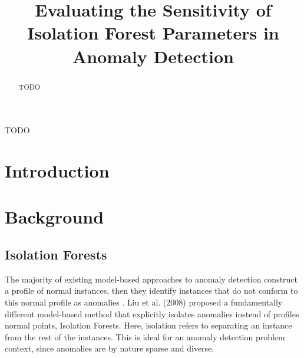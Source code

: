 \documentclass[10pt, conference]{IEEEtran}
\begin{document}
\title{Evaluating the Sensitivity of Isolation Forest Parameters in Anomaly Detection\\

}

\author{
}

\maketitle

\begin{abstract}
TODO
\end{abstract}

\begin{IEEEkeywords}
TODO
\end{IEEEkeywords}

\section{Introduction}






\section{Background}
\subsection{Isolation Forests}
The majority of existing model-based approaches to anomaly detection construct a profile of normal instances, then they identify instances that do not conform to this normal profile as anomalies \cite{iforest}. Liu et al. (2008) proposed a fundamentally different model-based method that explicitly isolates anomalies instead of profiles normal points, Isolation Forests. Here, isolation refers to separating an instance from the rest of the instances. This is ideal for an anomaly detection problem context, since anomalies are by nature sparse and diverse.
\end{document}
